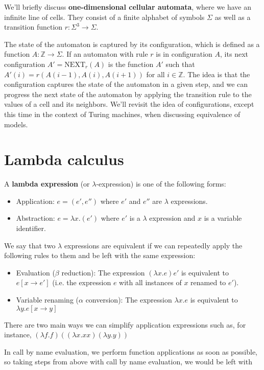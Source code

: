 \documentclass[11pt]{article}
\theoremstyle{definition}
\theoremstyle{remark}
\begin{document}
We'll briefly discuss \textbf{one-dimensional cellular automata}, where we have an infinite line of cells. They consist of a finite alphabet of symbols $\Sigma$ as well as a transition function $r: \Sigma^3 \to \Sigma$. 

The state of the automaton is captured by its configuration, which is defined as a function $A:\mathbb{Z} \rightarrow \Sigma$. If an automaton with rule $r$ is in configuration $A$, its next configuration $A' = \text{NEXT}_r(A)$ is the function $A'$ such that $A'(i) = r(A(i-1),A(i),A(i+1))$ for all $i\in \mathbb{Z}$. The idea is that the configuration captures the state of the automaton in a given step, and we can progress the next state of the automaton by applying the transition rule to the values of a cell and its neighbors. We'll revisit the idea of configurations, except this time in the context of Turing machines, when discussing equivalence of models.

\section{Lambda calculus} 

A \textbf{lambda expression} (or $\lambda$-expression) is one of the following forms:
\begin{itemize}
  \item Application: $e = (e', e'')$ where $e'$ and $e''$ are $\lambda$ expressions.
  \item Abstraction: $e = \lambda x.(e')$ where $e'$ is a $\lambda$ expression and $x$ is a variable identifier.
\end{itemize}

We say that two $\lambda$ expressions are equivalent if we can repeatedly apply the following rules to them and be left with the same expression:
\begin{itemize}
    \item Evaluation ($\beta$ reduction): The expression $(\lambda x . e)e'$ is equivalent to $e[x \to e']$ (i.e. the expression $e$  with all instances of $x$ renamed to $e'$).
    \item Variable renaming ($\alpha$ conversion): The expression $\lambda x . e$ is equivalent to $\lambda y. e [x \to y]$ 
\end{itemize}{}

There are two main ways we can simplify application expressions such as, for instance, $(\lambda f.f)((\lambda x. x x)(\lambda y.y))$

In call by name evaluation, we perform function applications as soon as possible, so taking steps from above with call by name evaluation, we would be left with
\end{document}
